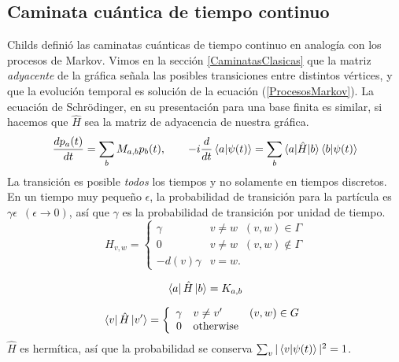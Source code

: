 \subsection{Caminata cuántica de tiempo continuo}
Childs definió las caminatas cuánticas de tiempo continuo en analogía con los procesos de Markov. Vimos en la sección \ref{CaminatasClasicas} que la matriz \textit{adyacente} de la gráfica señala las posibles transiciones entre distintos vértices, y que la evolución temporal es solución de la ecuación (\ref{ProcesosMarkov}). La ecuación de Schrödinger, en su presentación para una base finita es similar, si hacemos que $\hat{H}$ sea la matriz de adyacencia de nuestra gráfica.
\begin{equation}
\frac{dp_a(t)}{dt}=\sum_bM_{a,b}p_b(t),\qquad     
-i\frac{d}{dt}\braket{a|\psi(t)}=\sum_b\braket{a|\hat{H}|b}\braket{b|\psi(t)}
\end{equation}{}
La transición es posible \textit{todos} los tiempos y no solamente en tiempos discretos. En un tiempo muy pequeño $\epsilon$, la probabilidad de transición para la partícula es $\gamma \epsilon\,\,\,(\epsilon\xrightarrow{}0)$, así que $\gamma$ es la probabilidad de transición por unidad de tiempo. 
\begin{equation*}
    H_{v,w}=
    \left\{
    \begin{array}{ll}
    \gamma  &  v\neq w \;\; (v,w)\in \Gamma \\
    0   & v\neq w  \;\; (v,w) \not\in \Gamma  \\
    -d(v)\gamma & v=w.     
    \end{array}
    \right.
\end{equation*}{}

\begin{equation*}
    \bra{a}\hat{H}\ket{b}=K_{a,b}
\end{equation*}{}

\begin{equation*}
    \bra{v}\hat{H}\ket{v'}=
    \left\{
    \begin{array}{cll}
    \gamma  &  v\neq v' & (v,w)\in G  \\
    0 & \text{otherwise}  & \end{array}
    \right.
\end{equation*}{}
$\hat{H}$ es hermítica, así que la probabilidad se conserva $\sum_v |\braket{v|\psi(t)}|^2=1$.